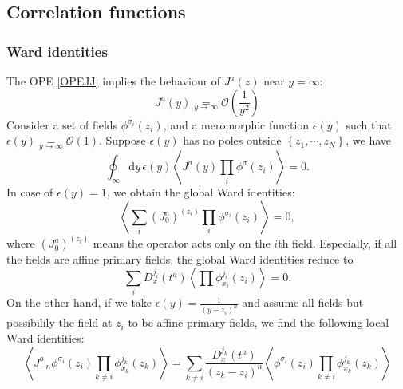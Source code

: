 \documentclass[10pt,a4paper]{article}
\numberwithin{equation}{section}
\newcommand{\vev}[1]{\left\langle #1 \right\rangle}
\begin{document}
\subsection{Correlation functions}

\subsubsection*{Ward identities}
The OPE \ref{OPEJJ} implies the behaviour of $J^{a}(z)$ near $y = \infty$:
\begin{equation}
    \boxed{
        J^{a}(y) \underset{y \rightarrow \infty}{=} \mathcal{O}\left(\frac{1}{y^{2}}\right)
    }
\end{equation}
Consider a set of fields $\phi^{\sigma_{i}}(z_{i})$, and a meromorphic function $\epsilon(y)$ such that
$\epsilon(y) \underset{y \rightarrow \infty}{=} \mathcal{O}\left(1\right) $. Suppose $\epsilon(y)$
has no poles outside $\left\{z_{1},\cdots,z_{N} \right\}$, we have 
\begin{equation}
    \oint_{\infty} \mathrm{d} y \, \epsilon(y) \vev{J^{a}(y) \prod_{i} \phi^{\sigma}(z_{i})} = 0. \label{WardId}
\end{equation}
In case of $\epsilon(y) = 1$, we obtain the global Ward identities:
\begin{equation}
    \vev{\sum_{i} \left(J^{a}_{0}\right)^{(z_{i})} \prod_{i} \phi^{\sigma_{i}}(z_{i})} = 0,
\end{equation}
where $\left(J^{a}_{0}\right)^{(z_{i})}$ means the operator acts only on the $i$th field. Especially, if all the fields are affine primary 
fields, the global Ward identities reduce to 
\begin{equation}
    \sum_{i} D^{j_{i}}_{x}(t^{a}) \vev{\prod \phi^{j_{i}}_{x_{i}}(z_{i})} = 0. \label{GlobalWard}
\end{equation}
On the other hand, if we take $\epsilon(y) = \frac{1}{(y-z_{i})^{n}}$ and assume all fields but possibilily the field at 
$z_{i}$ to be affine primary fields, we find the following local Ward identities:
\begin{equation}
    \vev{J^{a}_{-n} \phi^{\sigma_{i}}(z_{i}) \prod_{k \neq i} \phi^{j_{k}}_{x_{k}}(z_{k})} = \sum_{k\neq i} \frac{D^{j_{k}}_{x}(t^{a})}{(z_{k}-z_{i})^{n}} \vev{ \phi^{\sigma_{i}}(z_{i}) \prod_{k \neq i} \phi^{j_{k}}_{x_{k}}(z_{k})} \label{LocalWard}
\end{equation}
\end{document}
